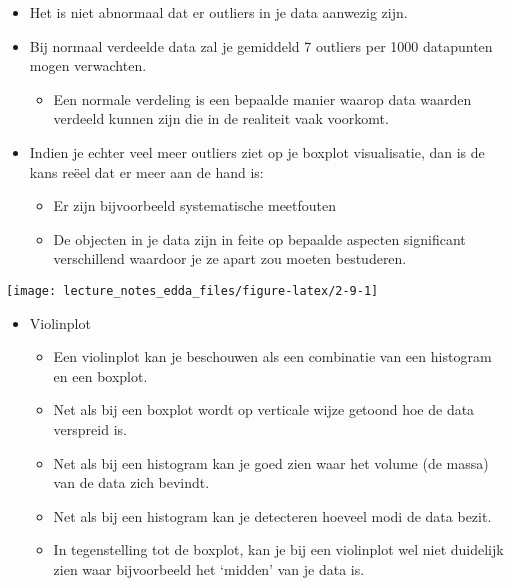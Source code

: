 \documentclass[]{memoir}
\providecommand{\tightlist}{%
  \setlength{\itemsep}{0pt}\setlength{\parskip}{0pt}}
\begin{document}
\begin{itemize}
\tightlist
\item
  Het is niet abnormaal dat er outliers in je data aanwezig zijn.
\item
  Bij normaal verdeelde data zal je gemiddeld 7 outliers per 1000
  datapunten mogen verwachten.

  \begin{itemize}
  \tightlist
  \item
    Een normale verdeling is een bepaalde manier waarop data waarden
    verdeeld kunnen zijn die in de realiteit vaak voorkomt.
  \end{itemize}
\item
  Indien je echter veel meer outliers ziet op je boxplot visualisatie,
  dan is de kans reëel dat er meer aan de hand is:

  \begin{itemize}
  \tightlist
  \item
    Er zijn bijvoorbeeld systematische meetfouten
  \item
    De objecten in je data zijn in feite op bepaalde aspecten
    significant verschillend waardoor je ze apart zou moeten bestuderen.
  \end{itemize}
\end{itemize}

\texttt{[image: lecture\_notes\_edda\_files/figure-latex/2-9-1]}

\begin{itemize}
\tightlist
\item
  Violinplot

  \begin{itemize}
  \tightlist
  \item
    Een violinplot kan je beschouwen als een combinatie van een
    histogram en een boxplot.
  \item
    Net als bij een boxplot wordt op verticale wijze getoond hoe de data
    verspreid is.
  \item
    Net als bij een histogram kan je goed zien waar het volume (de
    massa) van de data zich bevindt.
  \item
    Net als bij een histogram kan je detecteren hoeveel modi de data
    bezit.
  \item
    In tegenstelling tot de boxplot, kan je bij een violinplot wel niet
    duidelijk zien waar bijvoorbeeld het `midden' van je data is.
  \end{itemize}
\end{itemize}
\end{document}

